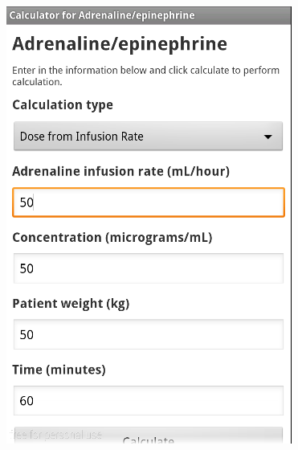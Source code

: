 \begin{figure}[H]
\centering
\begin{minipage}{.5\textwidth}
  \centering
  \includegraphics[width=.8\linewidth]{Images/screenshots/API10/calc.png}
\end{minipage}%
\begin{minipage}{.5\textwidth}
  \centering

\end{minipage}
\end{figure}
